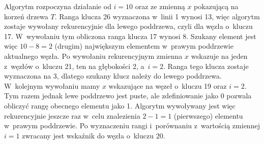 
\exercise %
Algorytm rozpoczyna działanie od $i=10$ oraz ze zmienną $x$ pokazującą na korzeń drzewa $T$.
Ranga klucza 26 wyznaczona w~linii 1 wynosi 13, więc algorytm zostaje wywołany rekurencyjnie dla lewego poddrzewa, czyli dla węzła o~kluczu 17.
W~wywołaniu tym obliczona ranga klucza 17 wynosi 8.
Szukany element jest więc $10-8=2$ (drugim) największym elementem w~prawym poddrzewie aktualnego węzła.
Po wywołaniu rekurencyjnym zmienna $x$ wskazuje na jeden z~węzłów o~kluczu 21, ten na głębokości 2, a~$i=2$.
Ranga tego klucza zostaje wyznaczona na 3, dlatego szukany klucz należy do lewego poddrzewa.
W~kolejnym wywołaniu mamy $x$ wskazujące na węzeł o~kluczu 19 oraz $i=2$.
Tym razem jednak lewe poddrzewo jest puste, ale zdefiniowanie  jako 0 pozwala obliczyć rangę obecnego elementu jako 1.
Algorytm wywoływany jest więc rekurencyjnie jeszcze raz w~celu znalezienia $2-1=1$ (pierwszego) elementu w~prawym poddrzewie.
Po wyznaczeniu rangi i~porównaniu z~wartością zmiennej $i=1$ zwracany jest wskaźnik do węzła o~kluczu 20.

\exercise %
\exercise %
\exercise %
\exercise %
\exercise %
\exercise %
\exercise %
